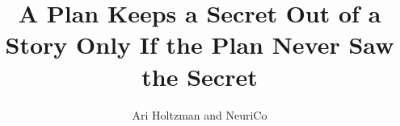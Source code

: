 \documentclass{article}
\title{A Plan Keeps a Secret Out of a Story Only If the Plan Never Saw the Secret}
\author{Ari Holtzman and NeuriCo}
\begin{document}
\maketitle

\begin{abstract}

\end{abstract}










\appendix

\end{document}
